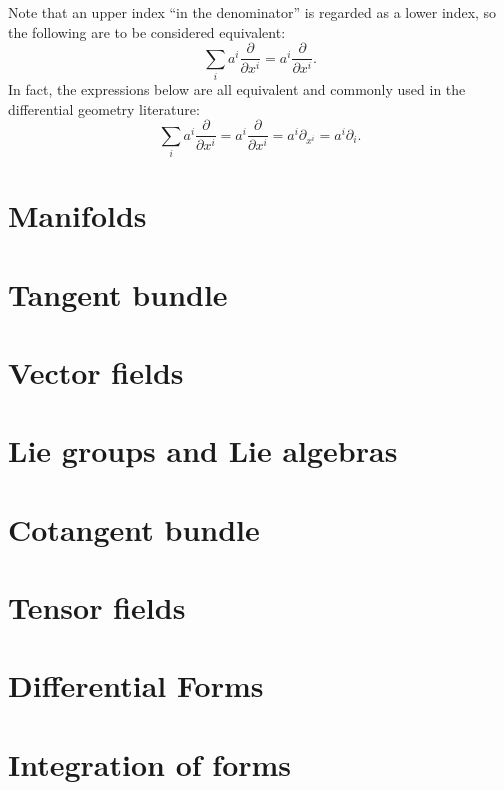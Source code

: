 \documentclass[nobib, a4paper]{tufte-book}
\theoremstyle{plain}
\theoremstyle{definition}
\theoremstyle{remark}
\begin{document}
Note that an upper index ``in the denominator'' is regarded as a lower index, so the following are to be considered equivalent:
\begin{equation}
  \sum_{i} a^i \frac{\partial}{\partial x^i} = a^i \frac{\partial}{\partial x^i}.
\end{equation}
In fact, the expressions below are all equivalent and commonly used in the differential geometry literature:
\begin{equation}
  \sum_{i} a^i \frac{\partial}{\partial x^i} = a^i \frac{\partial}{\partial x^i} = a^i \partial_{x^i} = a^i \partial_i.
\end{equation}

\chapter{Manifolds}\label{ch:manifolds}


\chapter{Tangent bundle}\label{ch:2}


\chapter{Vector fields}\label{ch:vf}


\chapter{Lie groups and Lie algebras}


\chapter{Cotangent bundle}\label{cg:ctb}


\chapter{Tensor fields}\label{cg:tf}


\chapter{Differential Forms}


\chapter{Integration of forms}

\end{document}
